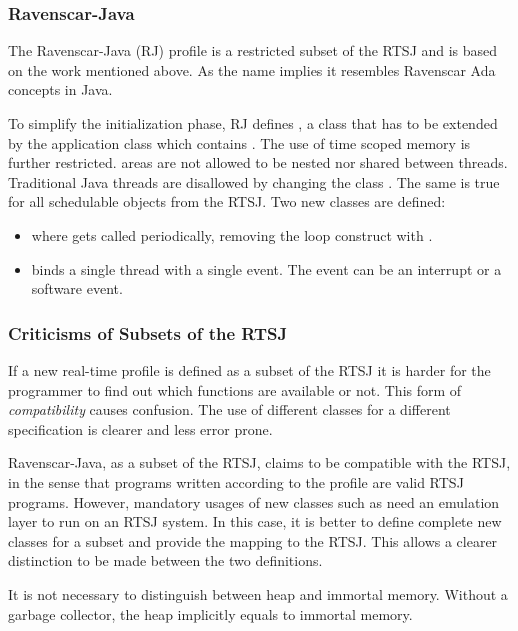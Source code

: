 \subsubsection{Ravenscar-Java}
\label{subsec:rj}

The Ravenscar-Java (RJ) profile \cite{583825} is a restricted subset
of the RTSJ and is based on the work mentioned above. As the name
implies it resembles Ravenscar Ada \cite{289525} concepts in Java.


To simplify the initialization phase, RJ defines ,
a class that has to be extended by the application class which
contains . The use of time scoped memory is further
restricted.  areas are not allowed to be nested nor
shared between threads. Traditional Java threads are disallowed by
changing the class . The same is true for all
schedulable objects from the RTSJ. Two new classes are defined:
\begin{itemize}
    \item {} where  gets called periodically,
removing the loop construct with .
    \item {} binds a single thread with a
single event. The event can be an interrupt or a software event.

\end{itemize}

\subsubsection{Criticisms of Subsets of the RTSJ}

If a new real-time profile is defined as a subset of the RTSJ it is
harder for the programmer to find out which functions are available
or not. This form of \textit{compatibility} causes confusion. The
use of different classes for a different specification is clearer
and less error prone.

Ravenscar-Java, as a subset of the RTSJ, claims to be compatible
with the RTSJ, in the sense that programs written according to the
profile are valid RTSJ programs. However, mandatory usages of new
classes such as  need an emulation layer to run
on an RTSJ system. In this case, it is better to define complete new
classes for a subset and provide the mapping to the RTSJ. This
allows a clearer distinction to be made between the two definitions.

It is not necessary to distinguish between heap and immortal memory.
Without a garbage collector, the heap implicitly equals to immortal
memory.

